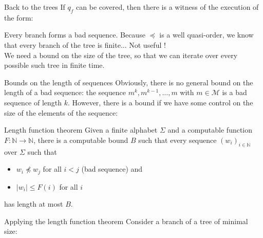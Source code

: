 \documentclass{beamer}
\newcommand{\messages}{\mathcal{M}}
\begin{document}
\begin{frame}{Back to the trees}
If $q_f$ can be covered, then there is a witness of the execution of the form:
\begin{center}
\resizebox{!}{4cm}{

}
\end{center}

Every branch forms a bad sequence. Because $\preceq$ is a well quasi-order, we know that every branch of the tree is finite... 
\pause Not useful ! \\ We need a bound on the size of the tree, so that we can iterate over every possible such tree in finite time. 
\end{frame}

\begin{frame}{Bounds on the length of sequences}
	Obviously, there is no general bound on the length of a bad sequence: the sequence $m^k, m^{k-1}, \dots, m$ with $m \in \messages$ is a bad sequence of length $k$.  
	\pause
	However, there is a bound if we have some control on the size of the elements of the sequence:

	\begin{block}{Length function theorem\footnotemark}
	Given a finite alphabet $\Sigma$ and a computable function $F : \mathbb{N} \to \mathbb{N}$, there is a computable bound $B$ such that every sequence $(w_i)_{i \in \mathbb{N}}$ over $\Sigma$ such that
	\begin{itemize}
		\item $w_i \npreceq w_j$ for all $i<j$ (bad sequence) and
		\item $|w_i| \leq F(i)$ for all $i$
	\end{itemize}
has length at most $B$.
\end{block}
\end{frame}

\begin{frame}{Applying the length function theorem}
Consider a branch of a tree of minimal size: \vspace{0.2cm} 

\begin{center}
\resizebox{!}{4.5cm}{

}
\end{center}

\end{frame}
\end{document}
